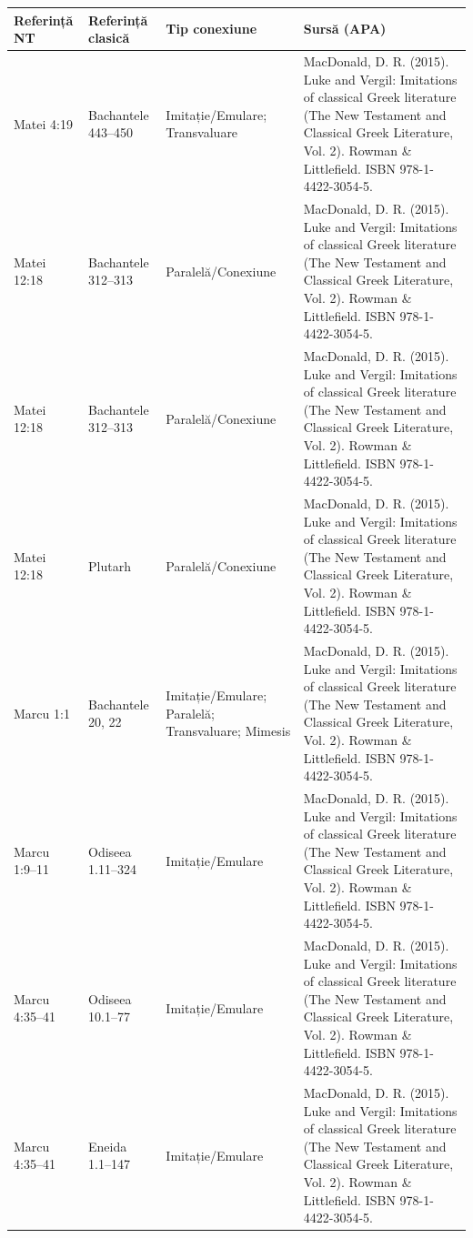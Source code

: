 \documentclass[12pt,a4paper,twoside,openany]{book}
\begin{document}
\small
\begin{longtable}{L{1.4cm}L{1.7cm}L{3.1cm}L{8.4cm}}
\toprule
{}
\textbf{Referință NT} & \textbf{Referință clasică} & \textbf{Tip conexiune} & \textbf{Sursă (APA)} \\
\midrule
\endhead
Matei 4:19 & Bachantele 443–450 & Imitație/Emulare; Transvaluare & MacDonald, D. R. (2015). Luke and Vergil: Imitations of classical Greek literature (The New Testament and Classical Greek Literature, Vol. 2). Rowman \& Littlefield. ISBN 978-1-4422-3054-5. \\
Matei 12:18 & Bachantele 312–313 & Paralelă/Conexiune & MacDonald, D. R. (2015). Luke and Vergil: Imitations of classical Greek literature (The New Testament and Classical Greek Literature, Vol. 2). Rowman \& Littlefield. ISBN 978-1-4422-3054-5. \\
Matei 12:18 & Bachantele 312–313 & Paralelă/Conexiune & MacDonald, D. R. (2015). Luke and Vergil: Imitations of classical Greek literature (The New Testament and Classical Greek Literature, Vol. 2). Rowman \& Littlefield. ISBN 978-1-4422-3054-5. \\
Matei 12:18 & Plutarh & Paralelă/Conexiune & MacDonald, D. R. (2015). Luke and Vergil: Imitations of classical Greek literature (The New Testament and Classical Greek Literature, Vol. 2). Rowman \& Littlefield. ISBN 978-1-4422-3054-5. \\
Marcu 1:1 & Bachantele 20, 22 & Imitație/Emulare; Paralelă; Transvaluare; Mimesis & MacDonald, D. R. (2015). Luke and Vergil: Imitations of classical Greek literature (The New Testament and Classical Greek Literature, Vol. 2). Rowman \& Littlefield. ISBN 978-1-4422-3054-5. \\
Marcu 1:9–11 & Odiseea 1.11–324 & Imitație/Emulare & MacDonald, D. R. (2015). Luke and Vergil: Imitations of classical Greek literature (The New Testament and Classical Greek Literature, Vol. 2). Rowman \& Littlefield. ISBN 978-1-4422-3054-5. \\
Marcu 4:35–41 & Odiseea 10.1–77 & Imitație/Emulare & MacDonald, D. R. (2015). Luke and Vergil: Imitations of classical Greek literature (The New Testament and Classical Greek Literature, Vol. 2). Rowman \& Littlefield. ISBN 978-1-4422-3054-5. \\
Marcu 4:35–41 & Eneida 1.1–147 & Imitație/Emulare & MacDonald, D. R. (2015). Luke and Vergil: Imitations of classical Greek literature (The New Testament and Classical Greek Literature, Vol. 2). Rowman \& Littlefield. ISBN 978-1-4422-3054-5. \\

\end{longtable}
\end{document}
